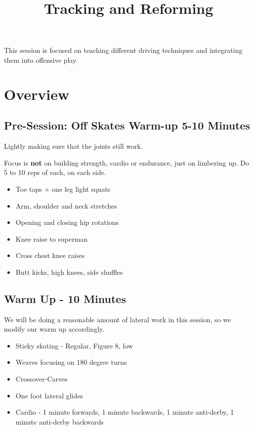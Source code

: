 \documentclass{journal}
\title{Tracking and Reforming}
\author{}
\begin{document}
\maketitle
\noindent 

This session is focused on teaching different driving techniques and integrating them into offensive play.


\section*{Overview}

\subsection*{Pre-Session: Off Skates Warm-up 5-10 Minutes}
Lightly making sure that the joints still work.

Focus is {\bf not} on building strength, cardio or endurance, just on limbering up. Do 5 to 10 reps of each, on each side. 

\begin{itemize}
\item Toe taps + one leg light squats
\item Arm, shoulder and neck stretches
\item Opening and closing hip rotations
\item Knee raise to superman 
\item Cross chest knee raises
\item Butt kicks, high knees, side shuffles
\end{itemize}


\subsection*{Warm Up - 10 Minutes}

We will be doing a reasonable amount of lateral work in this session, so we modify our warm up accordingly.
\begin{itemize}
\item Sticky skating - Regular, Figure 8, low
\item Weaves focusing on 180 degree turns 
\item Crossover-Carves 
\item One foot lateral glides
\item Cardio - 1 minute forwards, 1 minute backwards, 1 minute anti-derby, 1 minute anti-derby backwards 
\end{itemize}
\end{document}
